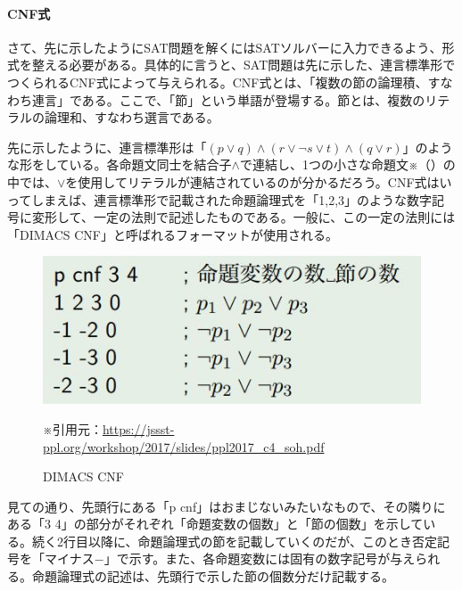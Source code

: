 \documentclass[dvipdfmx]{jsarticle}
\begin{document}
\paragraph{CNF式}さて、先に示したようにSAT問題を解くにはSATソルバーに入力できるよう、形式を整える必要がある。具体的に言うと、SAT問題は先に示した、連言標準形でつくられるCNF式によって与えられる。CNF式とは、「複数の節の論理積、すなわち連言」である。ここで、「節」という単語が登場する。節とは、複数のリテラルの論理和、すなわち選言である。\par
先に示したように、連言標準形は「$(p \vee q) \wedge (r \vee \neg s \vee t) \wedge (q \vee r)$」のような形をしている。各命題文同士を結合子$\wedge$で連結し、1つの小さな命題文※（）の中では、$\vee$を使用してリテラルが連結されているのが分かるだろう。CNF式はいってしまえば、連言標準形で記載された命題論理式を「1,2,3」のような数字記号に変形して、一定の法則で記述したものである。一般に、この一定の法則には「DIMACS CNF」と呼ばれるフォーマットが使用される。
\begin{figure}[H]
  \centering
  \includegraphics[scale=0.6]{cap2.JPG}
  \caption{DIMACS CNF}
  ※引用元：\url{https://jssst-ppl.org/workshop/2017/slides/ppl2017_c4_soh.pdf}
\end{figure}
見ての通り、先頭行にある「p cnf」はおまじないみたいなもので、その隣りにある「3 4」の部分がそれぞれ「命題変数の個数」と「節の個数」を示している。続く2行目以降に、命題論理式の節を記載していくのだが、このとき否定記号を「マイナス$-$」で示す。また、各命題変数には固有の数字記号が与えられる。命題論理式の記述は、先頭行で示した節の個数分だけ記載する。
\end{document}
